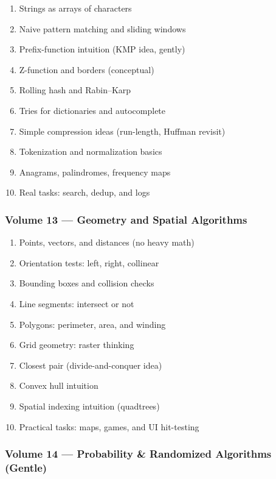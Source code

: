 \documentclass[
  letterpaper,
  DIV=11,
  numbers=noendperiod]{scrreprt}
\providecommand{\tightlist}{%
  \setlength{\itemsep}{0pt}\setlength{\parskip}{0pt}}
\begin{document}
\begin{enumerate}
\def\labelenumi{\arabic{enumi}.}
\setcounter{enumi}{110}
\tightlist
\item
  Strings as arrays of characters
\item
  Naive pattern matching and sliding windows
\item
  Prefix-function intuition (KMP idea, gently)
\item
  Z-function and borders (conceptual)
\item
  Rolling hash and Rabin--Karp
\item
  Tries for dictionaries and autocomplete
\item
  Simple compression ideas (run-length, Huffman revisit)
\item
  Tokenization and normalization basics
\item
  Anagrams, palindromes, frequency maps
\item
  Real tasks: search, dedup, and logs
\end{enumerate}

\subsubsection{Volume 13 --- Geometry and Spatial
Algorithms}\label{volume-13-geometry-and-spatial-algorithms}

\begin{enumerate}
\def\labelenumi{\arabic{enumi}.}
\setcounter{enumi}{120}
\tightlist
\item
  Points, vectors, and distances (no heavy math)
\item
  Orientation tests: left, right, collinear
\item
  Bounding boxes and collision checks
\item
  Line segments: intersect or not
\item
  Polygons: perimeter, area, and winding
\item
  Grid geometry: raster thinking
\item
  Closest pair (divide-and-conquer idea)
\item
  Convex hull intuition
\item
  Spatial indexing intuition (quadtrees)
\item
  Practical tasks: maps, games, and UI hit-testing
\end{enumerate}

\subsubsection{Volume 14 --- Probability \& Randomized Algorithms
(Gentle)}\label{volume-14-probability-randomized-algorithms-gentle}
\end{document}
